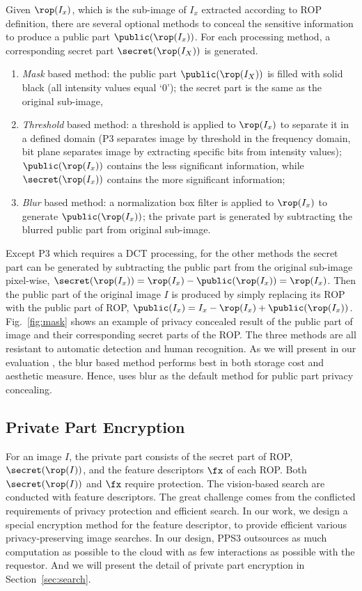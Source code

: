 {Given $\rop(I_x)$, which is the sub-image of $I_x$ extracted according to ROP definition,
 there are several optional methods to conceal
 the sensitive information to produce a public part $\public(\rop(I_x))$.
For each processing method,
 a corresponding secret part $\secret(\rop(I_X))$ is generated.
\begin{enumerate}
\item \emph{Mask} based method: the public part $\public(\rop(I_X))$ is filled with solid black (all intensity values equal `0'); the secret part is the same as the original sub-image,
\item \emph{Threshold} based method: a threshold is applied to $\rop(I_x)$ to
  separate it in a defined domain (\eg P3 separates image by threshold
  in the frequency domain, bit plane separates image by extracting
  specific bits from intensity values); $\public(\rop(I_x))$ contains
  the less significant information, while $\secret(\rop(I_x))$
  contains the more significant information;
\item \emph{Blur} based method: a normalization box filter is applied to
  $\rop(I_x)$ to generate $\public(\rop(I_x))$; the private part is
  generated by subtracting the blurred public part from original
  sub-image.
\end{enumerate}
Except P3 which requires a DCT processing,
 for the other methods the secret part can be generated by
 subtracting the public part from the original sub-image pixel-wise,
 \ie $\secret(\rop(I_x))=\rop(I_x)-\public(\rop(I_x))=\rop(I_x)$.
Then the public part of the  original image $I$
 is produced by simply replacing its ROP with the public part
 of ROP, \ie $\public(I_x) = I_x - \rop(I_x) + \public(\rop(I_x))$.
Fig.~\ref{fig:mask} shows an example of privacy concealed result of the public part
 of image and their corresponding secret parts of the ROP.
The three methods are all resistant to automatic detection and human recognition.
As we will present in our evaluation ,
 the blur based method performs best in both storage cost and aesthetic measure.
Hence, \ourprotocol uses blur as the default method
 for public part privacy concealing.



\subsection{Private Part Encryption}



For an image $I$, the private part consists of the secret part of ROP, \ie $\secret(\rop(I))$,
 and the feature descriptors $\fx$ of each ROP.
Both $\secret(\rop(I))$ and $\fx$ require protection.
The vision-based search are conducted with feature descriptors.
The great challenge comes from the
 conflicted requirements of privacy protection and efficient search.
In our work, we design a special encryption method for the feature descriptor,
 to provide efficient various privacy-preserving image searches.
In our design, PPS3  outsources as much computation as possible
 to the  cloud with as few interactions as possible with the
 requestor.
And we will present the detail of private part encryption in Section~\ref{sec:search}.




}
